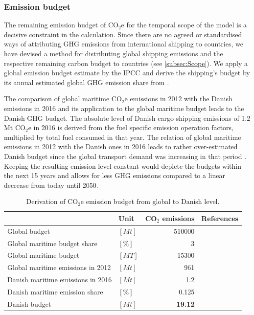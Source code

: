 \documentclass[article]{elsarticle}
\begin{document}
\subsubsection{Emission budget}
\label{subsec:em_budget}
The remaining emission budget of CO$_2$e for the temporal scope of the model is a decisive constraint in the calculation. Since there are no agreed or standardised ways of attributing GHG emissions from international shipping to countries, we have devised a method for distributing global shipping emissions and the respective remaining carbon budget to countries (see \ref{subsec:Scope}). We apply a global emission budget estimate by the IPCC \cite[Tab.~SPM.3, RCP2.6]{IPCC2013} and derive the shipping's budget by its annual estimated global GHG emission share from \citet{Olmer2017}.

The comparison of global maritime CO$_2$e emissions in 2012 with the Danish emissions in 2016 and its application to the global maritime budget leads to the Danish GHG budget. The absolute level of Danish cargo shipping emissions of 1.2 Mt CO$_2$e in 2016 is derived from the fuel specific emission operation factors, multiplied by total fuel consumed in that year. The relation of global maritime emissions in 2012 with the Danish ones in 2016 leads to rather over-estimated Danish budget since the global transport demand was increasing in that period \cite[Tab.~3,~p.~5]{UNCTAD2017}. Keeping the resulting emission level constant would deplete the budgets within the next 15 years and allows for less GHG emissions compared to a linear decrease from today until 2050.
\begin{table}[htb]
    \centering
    \begin{tabular}{llrr}
        \toprule
         & Unit & CO$_2$ emissions & References \\
         \midrule
         Global budget & $\left[Mt\right]$ & 510000 & \cite{IPCC2013} \\
         Global maritime budget share & $\left[\%\right]$ & 3 & \cite{Olmer2017} \\
         Global maritime budget & $\left[MT\right]$ & 15300 &\\[1.5ex]
         Global maritime emissions in 2012 & $\left[Mt\right]$ & 961 & \cite{Smith2014} \\
         Danish maritime emissions in 2016 & $\left[Mt\right]$ & 1.2 & \cite{Kristensen2012,Eurostat2018,Wisdom2017} \\
         Danish maritime emission share & $\left[\%\right]$ & 0.125 &\\[1.5ex]
         Danish budget & $\left[Mt\right]$ & \textbf{19.12} & \\
         \bottomrule
    \end{tabular}
    \caption{Derivation of CO$_2$e emission budget from global to Danish level.}
    \label{tab:dk_em_budget}
\end{table}
\end{document}
